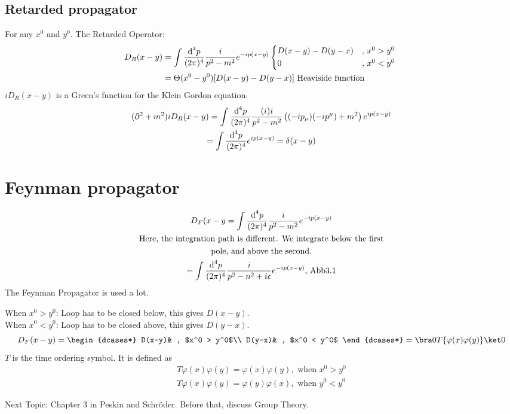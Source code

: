 \documentclass[]{scrartcl}
\begin{document}
\subsection{Retarded propagator}

For any $x^0$ and $y^0$. The Retarded Operator:
\begin{align}
	D_R(x-y) &= \int\frac{\text d^4 p}{(2\pi)^4}\frac{i}{p^2 - m^2}e^{-ip(x-y)}
	\begin{dcases*}
		D(x-y) - D(y-x) &, $x^0 > y^0$\\
		0 & , $x^0 < y^0$
	\end{dcases*}\\
	&= \Theta(x^0 - y^0)[D(x-y) - D(y-x)] \text{ Heaviside function}
\end{align}
$iD_R(x-y)$ is a Green's function for the Klein Gordon equation.
\begin{gather}
	(\partial^2 + m^2)i D_R(x-y) = \int\frac{\text d^4p}{(2\pi)^4}\frac{(i)i}{p^2 - m^2}\left((-ip_\mu)(-ip^\mu) + m^2\right)e^{ip(x-y)}\\
	= \int\frac{\text d^4p}{(2\pi)^4} e^{ip(x-y)} = \delta(x-y)
\end{gather}

\section{Feynman propagator}
\begin{gather}
	D_F(x-y = \int\frac{\text d^4p}{(2\pi)^4}\frac{i}{p^2-m^2}e^{-ip(x-y)}\\
	\text{Here, the integration path is different. We integrate below the first}\nonumber\\
	\text{pole, and above the second.}\nonumber\\
	= \int\frac{\text d^4p}{(2\pi)^4}\frac{i}{p^2-n^2 +i\epsilon}e^{-ip(x-y)} \text{, Abb3.1}
\end{gather}
The Feynman Propagator is used a lot.

When $x^0 > y^0$: Loop has to be closed below, this gives $D(x-y).$\\
When $x^0 < y^0$: Loop has to be closed above, this gives $D(y-x).$
\begin{equation}
	D_F(x-y) =
	\begin{dcases*}
		D(x-y)& , $x^0 > y^0$\\
		D(y-x)& , $x^0 < y^0$
	\end{dcases*}
= \bra 0 T\{\varphi(x)\varphi(y)\} \ket 0
\end{equation}
$T$ is the time ordering symbol. It is defined as
\begin{gather}
	T\varphi(x)\varphi(y) = \varphi(x)\varphi(y), \text{ when } x^0 > y^0\\
	T\varphi(x)\varphi(y) = \varphi(y)\varphi(x), \text{ when } y^0 < y^0
\end{gather}

Next Topic: Chapter 3 in Peskin and Schröder. Before that, discuss Group Theory.
\end{document}
